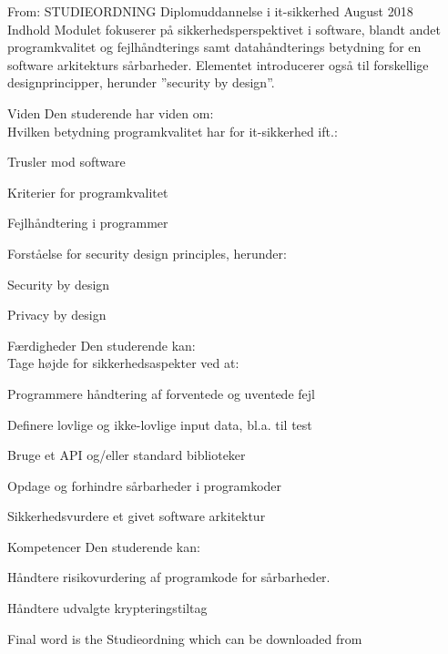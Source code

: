 \documentclass[Screen16to9,17pt]{foils}
\begin{document}

From: STUDIEORDNING Diplomuddannelse i it-sikkerhed August 2018\\
Indhold
Modulet fokuserer på sikkerhedsperspektivet i software, blandt andet
programkvalitet og fejlhåndterings samt datahåndterings betydning for en
software arkitekturs sårbarheder.
Elementet introducerer også til forskellige designprincipper, herunder ”security by design”.

Viden  Den studerende har viden om:\\
Hvilken betydning programkvalitet har for it-sikkerhed ift.:
\begin{list2}
\item Trusler mod software
\item Kriterier for programkvalitet
\item Fejlhåndtering i programmer
\item Forståelse for security design principles, herunder:
\item Security by design
\item Privacy by design
\end{list2}

Færdigheder Den studerende kan:\\
Tage højde for sikkerhedsaspekter ved at:
\begin{list2}
\item Programmere håndtering af forventede og uventede fejl
\item Definere lovlige og ikke-lovlige input data, bl.a. til test
\item Bruge et API og/eller standard biblioteker
\item Opdage og forhindre sårbarheder i programkoder
\item Sikkerhedsvurdere et givet software arkitektur
\end{list2}

Kompetencer Den studerende kan:
\begin{list2}
\item Håndtere risikovurdering af programkode for sårbarheder.
\item Håndtere udvalgte krypteringstiltag
\end{list2}

Final word is the Studieordning which can be downloaded from\\
{\footnotesize {}\\
}
\end{document}
